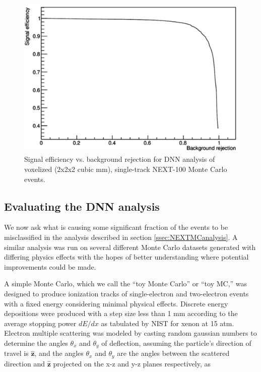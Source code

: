 \documentclass{JINST}
\begin{document}
\begin{figure}[!htb]
	\centering
	\includegraphics[scale=0.48]{fig/sigvsb_2x2x2_DNN.png}
	\caption{\label{fig_svsb}Signal efficiency vs. background rejection for DNN analysis of voxelized (2x2x2 cubic mm), single-track NEXT-100 Monte Carlo events.}
\end{figure}

\subsection{Evaluating the DNN analysis}\label{ssec:DNNeval}
We now ask what is causing some significant fraction of the events to be misclassified in the analysis described in section \ref{ssec:NEXTMCanalysis}.  A similar analysis was run on 
several different Monte Carlo datasets generated with differing physics effects with the hopes of better understanding where potential improvements could be made.

A simple Monte Carlo, which we call the ``toy Monte Carlo'' or ``toy MC,'' was designed to produce ionization tracks of single-electron and two-electron events with a fixed energy
considering minimal physical effects.  Discrete energy depositions were produced with a step size less than 1 mm according to the average stopping power $dE/dx$ as tabulated by
NIST \cite{NIST_mac} for xenon at 15 atm.  Electron multiple scattering was modeled by casting random gaussian numbers to determine the angles $\theta_{x}$ and $\theta_{y}$ of deflection, 
assuming the particle's direction of travel is $\hat{\mathbf{z}}$, and the angles $\theta_{x}$ and $\theta_{y}$ are the angles between the scattered direction and $\hat{\mathbf{z}}$ projected on 
the x-z and y-z planes respectively, as
\end{document}
